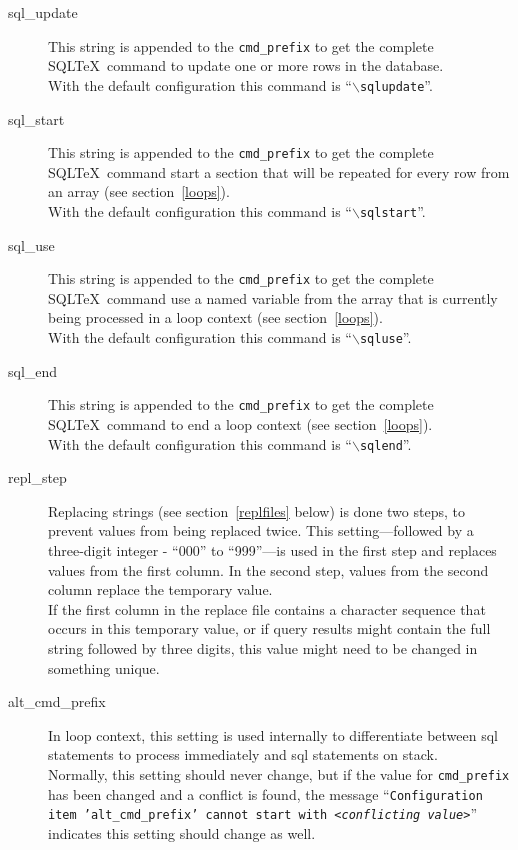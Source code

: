 \documentclass{article}
\newcommand{\bs}{\ensuremath{\backslash}}
\begin{document}
\begin{description}
\item[sql\_update] This string is appended to the \texttt{cmd\_prefix}
to get the complete SQL\TeX\ command to update one or more rows in the database.\\
With the default configuration this command is ``\texttt{\bs sqlupdate}''.

\item[sql\_start] This string is appended to the \texttt{cmd\_prefix} to get the complete SQL\TeX\ command start a section that will be repeated for every row from an array (see section~\ref{loops}).\\
With the default configuration this command is ``\texttt{\bs sqlstart}''.

\item[sql\_use] This string is appended to the \texttt{cmd\_prefix} to get the complete SQL\TeX\ command use a named variable from the array that is currently being processed in a loop context (see section~\ref{loops}).\\
With the default configuration this command is ``\texttt{\bs sqluse}''.

\item[sql\_end] This string is appended to the \texttt{cmd\_prefix} to get the complete SQL\TeX\ command to end a loop context (see section~\ref{loops}).\\
With the default configuration this command is ``\texttt{\bs sqlend}''.

\item[repl\_step] Replacing strings (see section~\ref{replfiles} below) is done two steps, to prevent values from being replaced twice.
This setting---followed by a three-digit integer - ``000'' to ``999''---is used in the first step and replaces values from the first column.
In the second step, values from the second column replace the temporary value. \\
If the first column in the replace file contains a character sequence that occurs in this temporary value, or if query results might contain the full string followed by three digits, this value might need to be changed in something unique.

\item[alt\_cmd\_prefix] In loop context, this setting is used internally to differentiate between sql statements to process immediately and sql statements on stack.\\
Normally, this setting should never change, but if the value for \texttt{cmd\_prefix} has been changed and a conflict is found, the message ``\texttt{Configuration item 'alt\_cmd\_prefix' cannot start with \textit{<conflicting value>}}'' indicates this setting should change as well.

\end{description}
\end{document}
